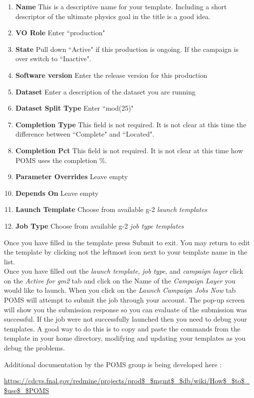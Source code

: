 \begin{enumerate}
\item[]{\bf{Name}} This is a descriptive name for your template. Including a short descriptor of the ultimate physics goal in the title is a good idea.
\item[]{\bf{VO Role}} Enter ``production"
\item[]{\bf{State}} Pull down ``Active" if this production is ongoing. If the campaign is over switch to ``Inactive".
\item[]{\bf{Software version}} Enter the release version for this production
\item[]{\bf{Dataset}} Enter a description of the dataset you are running
\item[]{\bf{Dataset Split Type}} Enter ``mod(25)"
\item[]{\bf{Completion Type}}  This field is not required. It is not clear at this time the difference between ``Complete" and ``Located".
\item[]{\bf{Completion Pct}} This field is not required. It is not clear at this time how POMS uses the completion $\%$.
\item[]{\bf{Parameter Overrides}} Leave empty
\item[]{\bf{Depends On}} Leave empty
\item[]{\bf{Launch Template}} Choose from available g-2 {\it {launch templates}}
\item[]{\bf{Job Type}} Choose from available g-2 {\it {job type templates}}
\end{enumerate}

\noindent Once you have filled in the template press Submit to exit. You may return to edit the template by clicking not the leftmost icon next to your template name in the list.\\

\noindent Once you have filled out the  {\it{launch template}}, {\it{job type}}, and {\it{campaign layer}} click on the {\it{Active for gm2}}  tab and click on the Name of the {\it{Campaign Layer}} you would like to launch. When you click on the {\it{Launch Campaign Jobs Now}} tab POMS will attempt to submit the job through your account. The pop-up screen will show you the submission response so you can evaluate of the submission was successful. If the job were not successfully launched then you need to debug your templates. A good way to do this is to copy and paste the commands from the template in your home directory, modifying and updating your templates as you debug the problems.  

\noindent Additional documentation by the POMS group is being developed here : 
\begin{center}
{\footnotesize
\url{https://cdcvs.fnal.gov/redmine/projects/prod$\_$mgmt$\_$db/wiki/How$\_$to$\_$use$\_$POMS}}
\end{center}



